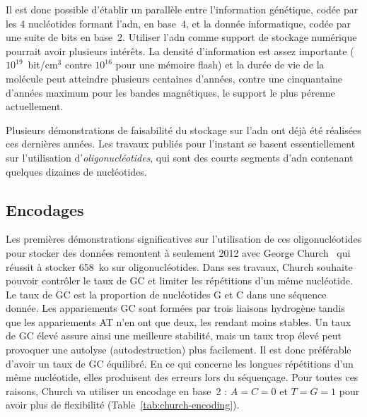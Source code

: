 \documentclass[a4paper]{report}
\begin{document}
Il est donc possible d'établir un parallèle entre l'information génétique, codée par les 4 nucléotides formant l'\ac{adn}, en base~4, et la donnée informatique, codée par une suite de bits en base~2.
Utiliser l'\ac{adn} comme support de stockage numérique
pourrait avoir plusieurs intérêts.
La densité d'information est assez importante
($10^{19}$~bit/cm$^3$ contre $10^{16}$ pour une mémoire flash)
et la durée de vie de la molécule peut atteindre plusieurs centaines d'années,
contre une cinquantaine d'années maximum pour les bandes magnétiques,
le support le plus pérenne actuellement.

Plusieurs démonstrations de faisabilité du stockage sur l’\ac{adn} ont déjà été réalisées ces dernières années.
Les travaux publiés pour l’instant se basent essentiellement sur l’utilisation d’\emph{oligonucléotides}, qui sont des courts segments d’\ac{adn} contenant quelques dizaines de nucléotides.

\subsection{Encodages}

Les premières démonstrations significatives sur l’utilisation de ces oligonucléotides pour stocker des données remontent à seulement 2012 avec George Church~\cite{church2012next} qui réussit à stocker 658~ko sur  oligonucléotides.
Dans ses travaux, Church souhaite pouvoir contrôler le taux de GC et limiter les répétitions d’un même nucléotide.
Le taux de GC est la proportion de nucléotides G et C dans une séquence donnée. 
Les appariements GC sont formées par trois liaisons hydrogène tandis que les appariements AT n'en ont que deux, les rendant moins stables.
Un taux de GC élevé assure ainsi une meilleure stabilité, mais un taux trop élevé peut provoquer une autolyse (autodestruction) plus facilement.
Il est donc préférable d’avoir un taux de GC équilibré.
En ce qui concerne les longues répétitions d’un même nucléotide, elles produisent des erreurs lors du séquençage.
Pour toutes ces raisons, Church va utiliser un encodage en base~2 : $A=C=0$ et $T=G=1$ pour avoir plus de flexibilité (Table~\ref{tab:church-encoding}).
\end{document}

